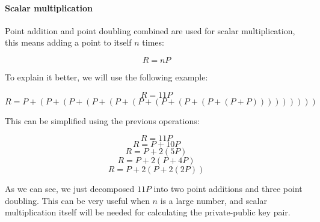 \documentclass{article}
\newcommand\tab[1][1cm]{\hspace*{#1}}
\begin{document}
\paragraph{Scalar multiplication}

\tab Point addition and point doubling combined are used for scalar multiplication, this means adding a point to itself \(n\) times:

\[R = nP\]

To explain it better, we will use the following example:

\[R = 11P\]
\[R = P + (P + (P + (P + (P + (P + (P + (P + (P + (P + P)))))))))\]

This can be simplified using the previous operations:

\[R = 11P\]
\[R = P + 10P\]
\[R = P + 2(5P)\]
\[R = P + 2(P + 4P)\]
\[R = P + 2(P + 2(2P))\]

As we can see, we just decomposed \(11P\) into two point additions and three point doubling. This can be very useful when \(n\) is a large number, and scalar multiplication itself will be needed for calculating the private-public key pair.




\nocite{*}
\printbibliography
\end{document}
